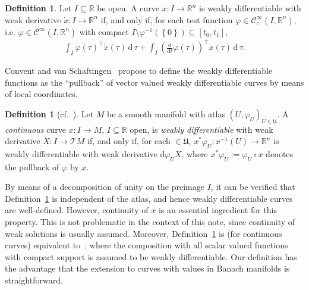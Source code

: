 \documentclass[preprint,12pt]{elsarticle}
\theoremstyle{definition}
\newtheorem{definition}[theorem]{Definition}
\newcommand{\set}[1]{\left\lbrace #1\right\rbrace}
\begin{document}
\begin{definition}
Let $I\subseteq\mathbb{R}$ be open. A curve $x:I\to\mathbb{R}^n$ is weakly differentiable with weak derivative $\dot{x}:I\to\mathbb{R}^n$ if, and only if, for each test function $\varphi\in\mathcal{C}^\infty_c(I,\mathbb{R}^n)$, i.e. $\varphi\in\mathcal{C}^\infty(I,\mathbb{R}^n)$ with compact $I\setminus\varphi^{-1}(\set{0})\subseteq [t_0,t_1]$,
\begin{align*}
\int_I \varphi(\tau)^\top \dot{x}(\tau)\,\mathrm{d}\,\tau + \int_I \left(\tfrac{\mathrm{d}}{\mathrm{d}t}\varphi(\tau)\right)^\top x(\tau)\,\mathrm{d}\,\tau.
\end{align*}
\end{definition}

Convent and van Schaftingen~\cite{ConvScha16} propose to define the weakly differentiable functions as the ``pullback'' of vector valued weakly differentiable curves by means of local coordinates.

\begin{definition}[{cf.~\cite[Definition 1.1 and Definition 1.3]{ConvScha16}}]\label{def:Sobolev_on_manifolds}
Let $M$ be a smooth manifold with atlas $(U,\varphi_U)_{U\in\mathfrak{U}}$. A \textit{continuous} curve $x:I\to M$, $I\subseteq\mathbb{R}$ open, is \textit{weakly differentiable} with weak derivative $X:I\to\mathcal{T}M$ if, and only if, for each $\in\mathfrak{U}$, $x^*\varphi_U:x^{-1}(U)\to \mathbb{R}^n$ is weakly differentiable with weak derivative $\mathrm{d}\varphi_UX$, where $x^*\varphi_U := \varphi_U\circ x$ denotes the pullback of $\varphi$ by $x$.
\end{definition}

By means of a decomposition of unity on the preimage $I$, it can be verified that Definition~\ref{def:Sobolev_on_manifolds} is independent of the atlas, and hence weakly differentiable curves are well-defined. However, continuity of $x$ is an essential ingredient for this property. This is not problematic in the context of this note, since continuity of weak solutions is usually assumed. Moreover, Definition~\ref{def:Sobolev_on_manifolds} is (for continuous curves) equivalent to~\cite[Definition 1.1 and Definition 1.3]{ConvScha16}, where the composition with all scalar valued functions with compact support is assumed to be weakly differentiable. Our definition has the advantage that the extension to curves with values in Banach manifolds is straightforward. 
\end{document}
